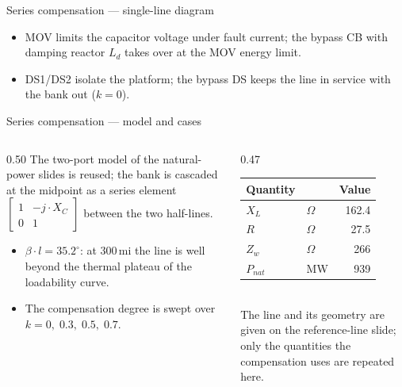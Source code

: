 \begin{frame}{Series compensation --- single-line diagram}
  \vspace{0.2em}
  {\small
  \begin{itemize}
    \setlength{\itemsep}{0.15em}
    \item MOV limits the capacitor voltage under fault current; the bypass CB
          with damping reactor $L_d$ takes over at the MOV energy limit.
    \item DS1/DS2 isolate the platform; the bypass DS keeps the line in
          service with the bank out ($k=0$).
  \end{itemize}}
\end{frame}

\begin{frame}{Series compensation --- model and cases}
  \begin{columns}[T,onlytextwidth]
    \begin{column}{0.50\textwidth}
      {\small The two-port model of the natural-power slides is reused; the
      bank is cascaded at the midpoint as a series element
      $\begin{bmatrix}1 & -j\cdot X_C\\ 0 & 1\end{bmatrix}$ between the two
      half-lines.}\\[0.6em]
      {\small
      \begin{itemize}
        \setlength{\itemsep}{0.3em}
        \item $\beta\cdot l = 35.2^\circ$: at 300\,mi the line is well
              beyond the thermal plateau of the loadability curve.
        \item The compensation degree is swept over
              $k = 0,\;0.3,\;0.5,\;0.7$.
      \end{itemize}}
    \end{column}
    \begin{column}{0.47\textwidth}
      \renewcommand{\arraystretch}{1.15}
      {\footnotesize
      \begin{tabular}{@{}l l r@{}}
        \textbf{Quantity} & & \multicolumn{1}{c}{\textbf{Value}} \\
        \hline
        $X_L$ & $\Omega$ & 162.4 \\
        $R$ & $\Omega$ & 27.5 \\
        $Z_w$ & $\Omega$ & 266 \\
        $P_{nat}$ & MW & 939 \\
        \hline
      \end{tabular}}\\[0.4em]
      {\color{atGray}\footnotesize The line and its geometry are given on
      the reference-line slide; only the quantities the compensation uses
      are repeated here.}
    \end{column}
  \end{columns}
\end{frame}

